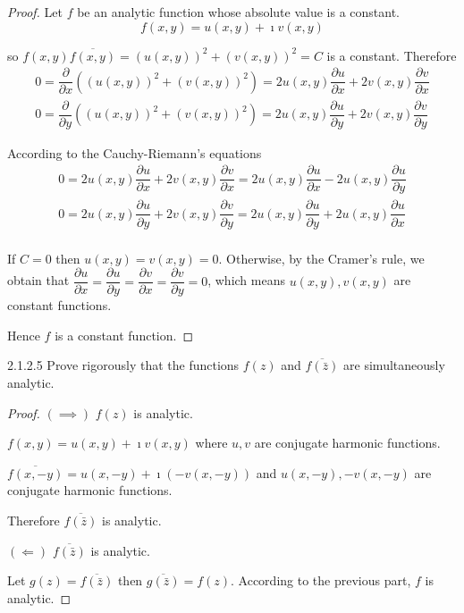 \begin{proof}
	Let \( f \) be an analytic function whose absolute value is a constant.
	\[
		f(x, y) = u(x, y) + \imath v(x, y)
	\]

	so \( f(x, y)\overline{f(x, y)} = {(u(x, y))}^{2} + {(v(x, y))}^{2} = C \) is a constant. Therefore
	\[
		\begin{split}
			0 = \dfrac{\partial}{\partial x}\left( {(u(x, y))}^{2} + {(v(x, y))}^{2} \right) = 2u(x, y) \dfrac{\partial u}{\partial x} + 2v(x, y) \dfrac{\partial v}{\partial x} \\
			0 = \dfrac{\partial}{\partial y}\left( {(u(x, y))}^{2} + {(v(x, y))}^{2} \right) = 2u(x, y) \dfrac{\partial u}{\partial y} + 2v(x, y) \dfrac{\partial v}{\partial y}
		\end{split}
	\]

	According to the Cauchy-Riemann's equations
	\[
		\begin{split}
			0 = 2u(x, y) \dfrac{\partial u}{\partial x} + 2v(x, y) \dfrac{\partial v}{\partial x} = 2u(x, y) \dfrac{\partial u}{\partial x} - 2u(x, y) \dfrac{\partial u}{\partial y} \\
			0 = 2u(x, y) \dfrac{\partial u}{\partial y} + 2v(x, y) \dfrac{\partial v}{\partial y} = 2u(x, y) \dfrac{\partial u}{\partial y} + 2u(x, y) \dfrac{\partial u}{\partial x} \\
		\end{split}
	\]

	If \( C = 0 \) then \( u(x, y) = v(x, y) = 0 \). Otherwise, by the Cramer's rule, we obtain that \( \dfrac{\partial u}{\partial x} = \dfrac{\partial u}{\partial y} = \dfrac{\partial v}{\partial x} = \dfrac{\partial v}{\partial y} = 0 \), which means \( u(x, y), v(x, y) \) are constant functions.

	Hence \( f \) is a constant function.
\end{proof}

\begin{problem}{2.1.2.5}
Prove rigorously that the functions \( f(z) \) and \( \overline{f(\bar{z})} \) are simultaneously analytic.
\end{problem}

\begin{proof}
	\( (\implies) \) \( f(z) \) is analytic.

	\( f(x, y) = u(x, y) + \imath v(x, y) \) where \( u, v \) are conjugate harmonic functions.

	\( \overline{f(x, -y)} = u(x, -y) + \imath (-v(x, -y)) \) and \( u(x, -y), -v(x, -y) \) are conjugate harmonic functions.

	Therefore \( \overline{f(\bar{z})} \) is analytic.

	\( (\Longleftarrow) \) \( \overline{f(\bar{z})} \) is analytic.

	Let \( g(z) = \overline{f(\bar{z})} \) then \( \overline{g(\bar{z})} = f(z) \). According to the previous part, \( f \) is analytic.
\end{proof}


